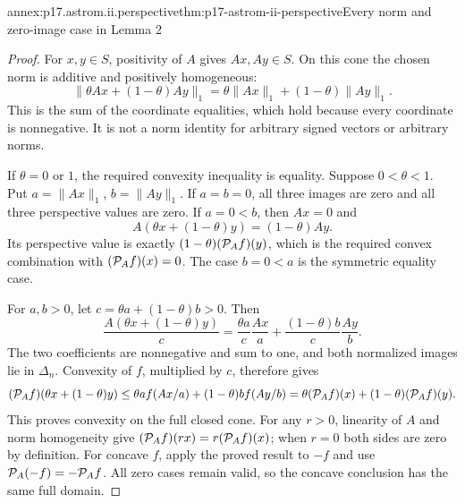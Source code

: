 \begin{annexitem}{annex:p17.astrom.ii.perspective}{thm:p17-astrom-ii-perspective}{Every norm and zero-image case in Lemma 2}
\begin{proof}
For \(x,y\in S\), positivity of \(A\) gives
\(Ax,Ay\in S\). On this cone the chosen norm
is additive and positively homogeneous:
\[
 \|\theta Ax+(1-\theta)Ay\|_1
          =\theta\|Ax\|_1+(1-\theta)\|Ay\|_1.
\]
This is the sum of the coordinate equalities,
which hold because every coordinate is nonnegative.
It is not a norm identity for arbitrary signed
vectors or arbitrary norms.

If \(\theta=0\) or \(1\), the required convexity
inequality is equality. Suppose \(0<\theta<1\).
Put \(a=\|Ax\|_1\), \(b=\|Ay\|_1\).
If \(a=b=0\), all three images are zero and all
three perspective values are zero.
If \(a=0<b\), then \(Ax=0\) and
\[
 A(\theta x+(1-\theta)y)=(1-\theta)Ay.
\]
Its perspective value is exactly
\((1-\theta)({\cal P}_Af)(y)\), which is the
required convex combination with
\(({\cal P}_Af)(x)=0\).
The case \(b=0<a\) is the symmetric equality case.

For \(a,b>0\), let \(c=\theta a+(1-\theta)b>0\).
Then
\[
 \frac{A(\theta x+(1-\theta)y)}c
       =\frac{\theta a}{c}\frac{Ax}{a}
             +\frac{(1-\theta)b}{c}\frac{Ay}{b}.
\]
The two coefficients are nonnegative and sum to
one, and both normalized images lie in \(\Delta_n\).
Convexity of \(f\), multiplied by \(c\), therefore
gives
\[
 ({\cal P}_Af)(\theta x+(1-\theta)y)
      \leq\theta a f(Ax/a)+(1-\theta)b f(Ay/b)
      =\theta({\cal P}_Af)(x)+(1-\theta)({\cal P}_Af)(y).
\]
This proves convexity on the full closed cone.
For any \(r>0\), linearity of \(A\) and norm
homogeneity give
\(({\cal P}_Af)(rx)=r({\cal P}_Af)(x)\);
when \(r=0\) both sides are zero by definition.
For concave \(f\), apply the proved result to
\(-f\) and use
\({\cal P}_A(-f)=-{\cal P}_Af\).
All zero cases remain valid, so the concave
conclusion has the same full domain.
\end{proof}
\end{annexitem}

